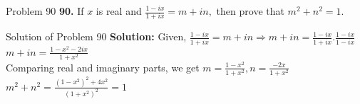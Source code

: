 \documentclass[aspectratio=169,8pt]{beamer}
\begin{document}
\begin{frame}{Problem 90}
  \textbf{90.} If $x$ is real and $\frac{1 -ix}{1 + ix} = m + in,$ then prove that $m^2 + n^2 = 1.$
\end{frame}
\begin{frame}{Solution of Problem 90}
  \textbf{Solution:} Given, $\frac{1 -ix}{1 + ix} = m + in \Rightarrow m + in = \frac{1 - ix}{1 + ix}.\frac{1 - ix}{1 - ix}$\\
  \vspace*{0.2cm}
  $m + in = \frac{1 - x^2 - 2ix}{1 + x^2}$\\
  \vspace*{0.2cm}
  Comparing real and imaginary parts, we get
  $m = \frac{1 - x^2}{1 + x^2}, n = \frac{-2x}{1 + x^2}$\\
  \vspace*{0.2cm}
  $m^2 + n^2 = \frac{(1 - x^2)^2 + 4x^2}{(1 + x^2)^2} = 1$
\end{frame}
\end{document}
